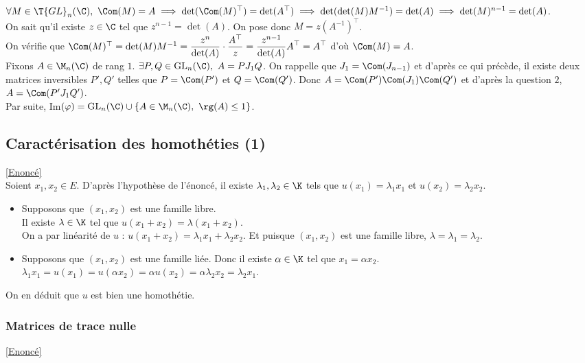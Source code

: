 \documentclass[8pt]{book}
\begin{document}
\begin{enumerate}[leftmargin=*]
		$\forall M\in \T{GL}_n(\C),\ \Com(M)=A\implies \det(\Com(M)^\top)=\det(A^\top)\implies\det(\det(M)M^{-1})=\det(A)\implies\det(M)^{n-1}=\det(A)$.\\
		On sait qu'il existe $z\in \C$ tel que $z^{n-1}=\det(A)$. On pose donc $M=z\left(A^{-1}\right)^\top$.\\
		On vérifie que $\Com(M)^\top=\det(M)M^{-1}=\displaystyle\frac{z^n}{\det(A)}\cdot\frac{A^\top}{z}=\frac{z^{n-1}}{\det(A)}A^\top=A^\top$ d'où $\Com(M)=A$.\\
		Fixons $A\in \M_n(\C)$ de rang $1$. $\exists P,Q\in \text{GL}_n(\C),\ A=PJ_1Q$. On rappelle que $J_1=\Com(J_{n-1})$ et d'après ce qui précède, il existe deux matrices inversibles $P',Q'$ telles que $P=\Com(P')$ et $Q=\Com(Q')$. Donc $A=\Com(P')\Com(J_1)\Com(Q')$ et d'après la question $2$, $A=\Com(P'J_1Q')$.\\
		Par suite, Im$(\varphi)=\text{GL}_n(\C)\cup\{A\in \M_n(\C),\ \rg(A)\leq 1\}$.
	\end{enumerate}
	
	\subsection{Caractérisation des homothéties (1) }
	\label{Caractérisation des homothéties (1) corrigé}
	\textcolor{blue}{\hyperref[Caractérisation des homothéties (1)]{[Enoncé]}}\\
	Soient $x_1,x_2 \in E$. D'après l'hypothèse de l'énoncé, il existe $\lambda_1,\lambda_2 \in \K$ tels que $u(x_1)=\lambda_1x_1$ et $u(x_2)=\lambda_2x_2$.
	\begin{itemize}
		\item  Supposons que $(x_1,x_2)$ est une famille libre.\\ 
		Il existe $\lambda\in\K$ tel que $u(x_1+x_2)=\lambda(x_1+x_2).$\\
		On a par linéarité de $u$ : $u(x_1+x_2)=\lambda_1 x_1 +\lambda_2x_2$. Et puisque $(x_1,x_2)$ est une famille libre, $\lambda=\lambda_1=\lambda_2$.
		\item Supposons que $(x_1,x_2)$ est une famille liée. Donc il existe $\alpha\in\K$ tel que $x_1=\alpha x_2.$\\
		$\lambda_1x_1=u(x_1)=u(\alpha x_2)=\alpha u(x_2)=\alpha\lambda_2x_2=\lambda_2x_1$. 
	\end{itemize}
	On en déduit que $u$ est bien une homothétie.
	
	\subsubsection{Matrices de trace nulle}
	\label{Matrices de trace nulle corrigé}
	\textcolor{blue}{\hyperref[Matrices de trace nulle]{[Enoncé]}}\\
	
\end{document}
